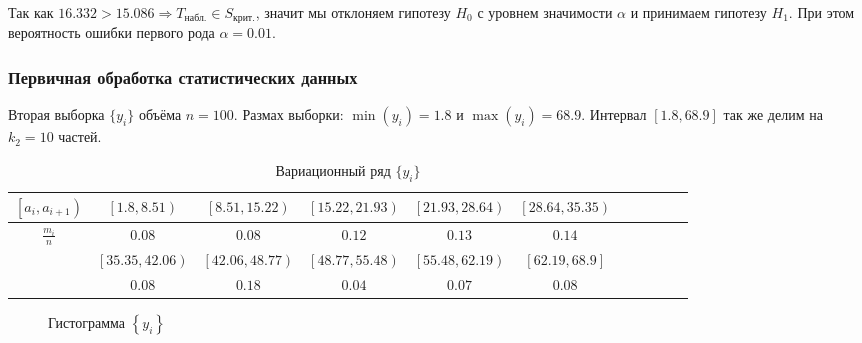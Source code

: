 \documentclass{report}
\begin{document}
Так как $16.332 > 15.086  \Rightarrow T_{\text{набл.}} \in S_{\text{крит.}}$, значит мы отклоняем гипотезу $H_0$ с уровнем значимости $\alpha$ и принимаем гипотезу $H_1$. При этом вероятность ошибки первого рода $\alpha = 0.01$.

\newpage

\subsubsection{Первичная обработка статистических данных}

Вторая выборка $\{ y_i \}$ объёма $n = 100$.
Размах выборки: $\min(y_i) = 1.8$ и $\max(y_i) = 68.9$. 
Интервал $[1.8, 68.9]$ так же делим на $k_2 = 10$ частей. 

\begin{table}[h]
\begin{tabularx}{\textwidth}{|c|c|c|c|c|c|c|c|c|c|c|}
\hline
    $\left [a_i, a_{i+1}\right)$ & $\left [1.8, 8.51\right )$ & $\left [8.51, 15.22\right )$ & $\left [15.22, 21.93\right )$ & $\left [21.93, 28.64\right )$ & $\left [28.64, 35.35\right )$ \\
\hline
    $\frac{m_i}{n}$ & $0.08$ & $0.08$ & $0.12$ & $0.13$ & $0.14$ \\
\hline
\hline
    & $\left [35.35, 42.06\right )$ & $\left [42.06, 48.77\right )$ & $\left [48.77, 55.48\right )$ & $\left [55.48, 62.19\right )$ & $\left [62.19, 68.9\right ]$ \\
\hline
    & $0.08$ & $0.18$ & $0.04$ & $0.07$ & $0.08$ \\
\hline
\end{tabularx}
\setcounter{table}{2}
\caption {Вариационный ряд $\{ y_i \}$}
\end{table}

\begin{figure}[h] \label{fig:2}
\centering
{}
\caption{Гистограмма $\left \{ y_i \right\}$}
\end{figure}
\end{document}
